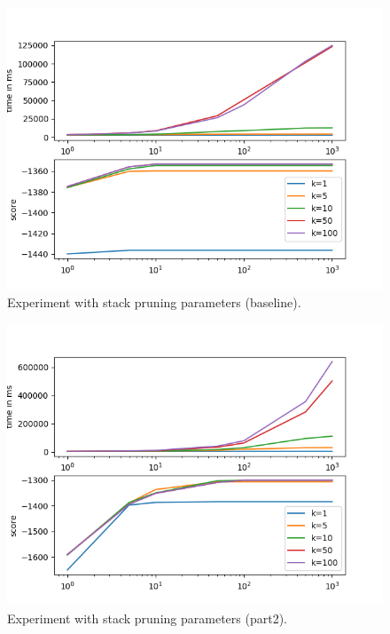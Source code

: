 \documentclass[answers]{exam}
\begin{document}
\begin{questions}
\begin{framed}
\end{framed}


\begin{framed}
\end{framed}


\addtocounter{question}{1}
\begin{framed}
\end{framed}
\end{questions}



\begin{figure}
  \centering
  \includegraphics{fig-default}
  \caption[Experiment (baseline).]{Experiment with stack pruning parameters
    (baseline).}
  \label{fig:exp-baseline}
\end{figure}

\begin{figure}
  \centering
  \includegraphics{fig-part2}
  \caption[Experiment (baseline).]{Experiment with stack pruning parameters
    (part2).}
  \label{fig:exp-part2}
\end{figure}
\end{document}
